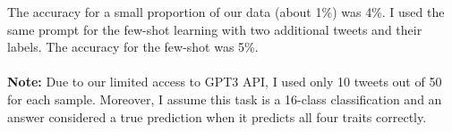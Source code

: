 The accuracy for a small proportion of our data (about 1\%) was 4\%. I used the same prompt for the few-shot learning with two additional tweets and their labels. The accuracy for the few-shot was 5\%.
\\
\\
\textbf{Note:} Due to our limited access to GPT3 API, I used only 10 tweets out of 50 for each sample. Moreover, I assume this task is a 16-class classification and an answer considered a true prediction when it predicts all four traits correctly.

